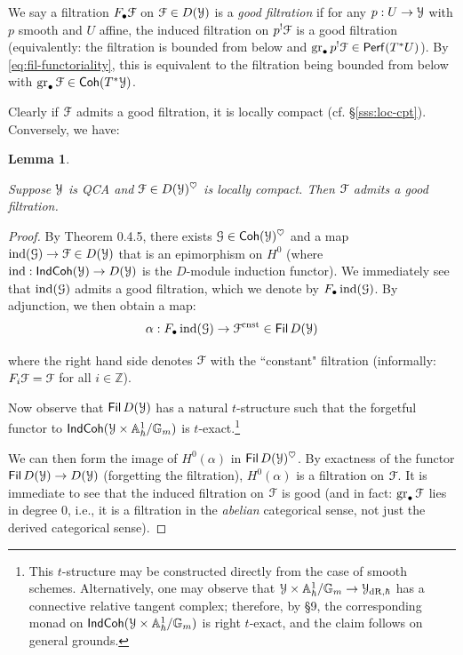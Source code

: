 \documentclass[reqno,11pt]{amsart}
\numberwithin{equation}{subsection}
\newtheorem{lem}[thm]{Lemma}
\theoremstyle{remark}
\newcommand{\bA}{{\mathbb A}}
\newcommand{\bG}{{\mathbb G}}
\newcommand{\bZ}{{\mathbb Z}}
\newcommand{\sF}{{\EuScript F}}
\newcommand{\sG}{{\EuScript G}}
\newcommand{\sY}{{\EuScript Y}}
\newcommand{\on}{\operatorname}
\newcommand{\ind}{\on{ind}}
\newcommand{\gr}{\on{gr}}
\renewcommand{\dot}{\bullet}
\newcommand{\Fil}{\mathsf{Fil}\,}
\newcommand{\fil}{F}
\newcommand{\heart}{\heartsuit}
\newcommand{\Perf}{\mathsf{Perf}}
\newcommand{\Coh}{\mathsf{Coh}}
\newcommand{\IndCoh}{\mathsf{IndCoh}}
\newcommand{\dR}{\on{dR}}
\begin{document}
We say a filtration $\fil_{\dot} \sF$ on $\sF \in D(\sY)$ is a
\emph{good filtration} if for any $p:U \to \sY$ with 
$p$ smooth and $U$ affine, the induced filtration on $p^!\sF$
is a good filtration (equivalently: the filtration is bounded from
below and $\gr_{\dot} p^! \sF \in \Perf(T^*U)$).
By \eqref{eq:fil-functoriality}, this is equivalent to the filtration being bounded from 
below with $\gr_{\dot} \sF \in \Coh(T^*\sY)$.

Clearly if $\sF$ admits a good filtration, it is locally compact
(cf. \S \ref{sss:loc-cpt}).
Conversely, we have:

\begin{lem}\label{l:good-fil}

Suppose $\sY$ is QCA and $\sF \in D(\sY)^{\heart}$ is locally compact. 
Then $\sF$ admits a good filtration.

\end{lem}

\begin{proof}

By \cite{dg-finiteness} Theorem 0.4.5, there exists
$\sG \in \Coh(\sY)^{\heart}$ and a map 
$\ind(\sG) \to \sF \in D(\sY)$ that is an epimorphism on 
$H^0$ (where $\ind:\IndCoh(\sY) \to D(\sY)$ is the $D$-module
induction functor). 
We immediately see that $\ind(\sG)$ admits a good filtration, 
which we denote by $\fil_{\dot} \ind(\sG)$.
By adjunction, we 
then obtain a map: 
%
\[
\alpha:\fil_{\dot} \ind(\sG) \to \sF^{\on{cnst}} \in \Fil D(\sY)
\]

\noindent where the right hand side denotes $\sF$ with the ``constant" filtration
(informally: $\fil_i \sF = \sF$ for all $i \in \bZ$). 

Now observe that $\Fil D(\sY)$ has a natural $t$-structure
such that the forgetful functor to $\IndCoh(\sY \times \bA_{\hbar}^1/\bG_m)$ is
$t$-exact.\footnote{This $t$-structure may be constructed
directly from the case of smooth schemes. Alternatively, 
one may observe that $\sY \times \bA_{\hbar}^1/\bG_m \to 
\sY_{\dR,\hbar}$ has a connective relative tangent complex; therefore,
by \cite{gr-ii} \S 9, the corresponding monad on 
$\IndCoh(\sY \times \bA_{\hbar}^1/\bG_m)$ is right $t$-exact, and the claim
follows on general grounds.}

We can then form the image of $H^0(\alpha)$ in $\Fil D(\sY)^{\heart}$.
By exactness of the functor $\Fil D(\sY) \to D(\sY)$ (forgetting the filtration),
$H^0(\alpha)$ is a filtration on $\sF$. It is immediate to see that
the induced filtration on $\sF$ is good (and in fact: $\gr_{\dot}\sF$ lies in 
degree 0, i.e., it is a filtration in the \emph{abelian} categorical
sense, not just the derived categorical sense).

\end{proof}
\end{document}
